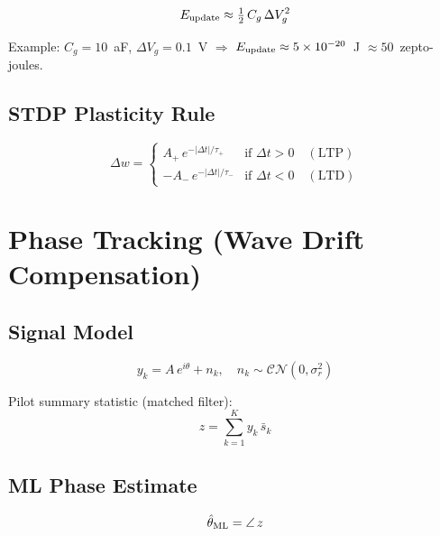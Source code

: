 \documentclass[12pt, a4paper]{article}
\begin{document}
\begin{equation}\label{eq:update_energy}
  E_{\rm update} \approx \tfrac{1}{2}\,C_g\,\Delta V_g^2
\end{equation}

Example: $C_g = 10$~aF, $\Delta V_g = 0.1$~V $\Rightarrow$ $E_{\rm update} \approx 5\times10^{-20}$~J $\approx 50$~zepto-joules.

\subsection{STDP Plasticity Rule}

\begin{equation}\label{eq:stdp}
  \Delta w =
  \begin{cases}
    A_+\,e^{-|\Delta t|/\tau_+} & \text{if } \Delta t > 0 \quad (\text{LTP})\\
    -A_-\,e^{-|\Delta t|/\tau_-} & \text{if } \Delta t < 0 \quad (\text{LTD})
  \end{cases}
\end{equation}

\section{Phase Tracking (Wave Drift Compensation)}

\subsection{Signal Model}

\begin{equation}\label{eq:signal_model}
  y_k = A\,e^{i\theta} + n_k, \quad n_k \sim \mathcal{CN}(0,\sigma_r^2)
\end{equation}

Pilot summary statistic (matched filter):
\begin{equation}\label{eq:pilot_stat}
  z = \sum_{k=1}^{K} y_k\,\bar{s}_k
\end{equation}

\subsection{ML Phase Estimate}

\begin{equation}\label{eq:ml_phase}
  \hat{\theta}_{\rm ML} = \angle\, z
\end{equation}
\end{document}

